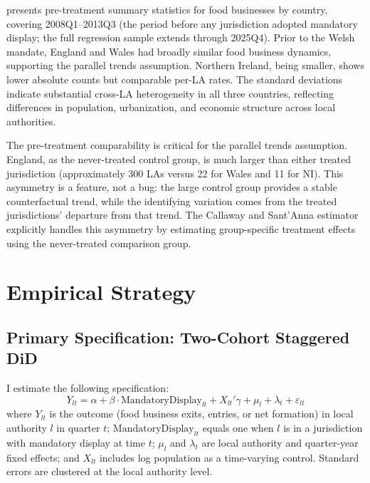\documentclass[12pt]{article}
\begin{document}


 presents pre-treatment summary statistics for food businesses by country, covering 2008Q1--2013Q3 (the period before any jurisdiction adopted mandatory display; the full regression sample extends through 2025Q4). Prior to the Welsh mandate, England and Wales had broadly similar food business dynamics, supporting the parallel trends assumption. Northern Ireland, being smaller, shows lower absolute counts but comparable per-LA rates. The standard deviations indicate substantial cross-LA heterogeneity in all three countries, reflecting differences in population, urbanization, and economic structure across local authorities.

The pre-treatment comparability is critical for the parallel trends assumption. England, as the never-treated control group, is much larger than either treated jurisdiction (approximately 300 LAs versus 22 for Wales and 11 for NI). This asymmetry is a feature, not a bug: the large control group provides a stable counterfactual trend, while the identifying variation comes from the treated jurisdictions' departure from that trend. The Callaway and Sant'Anna estimator explicitly handles this asymmetry by estimating group-specific treatment effects using the never-treated comparison group.


\section{Empirical Strategy}
\label{sec:strategy}

\subsection{Primary Specification: Two-Cohort Staggered DiD}

I estimate the following specification:
\begin{equation}
Y_{lt} = \alpha + \beta \cdot \text{MandatoryDisplay}_{lt} + X_{lt}'\gamma + \mu_l + \lambda_t + \varepsilon_{lt}
\label{eq:did}
\end{equation}
where $Y_{lt}$ is the outcome (food business exits, entries, or net formation) in local authority $l$ in quarter $t$; $\text{MandatoryDisplay}_{lt}$ equals one when $l$ is in a jurisdiction with mandatory display at time $t$; $\mu_l$ and $\lambda_t$ are local authority and quarter-year fixed effects; and $X_{lt}$ includes log population as a time-varying control. Standard errors are clustered at the local authority level.
\end{document}
